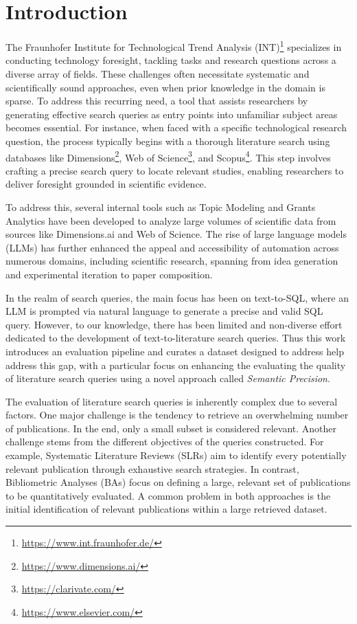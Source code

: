 \chapter{Introduction}\label{ch:intro}

The Fraunhofer Institute for Technological Trend Analysis (INT)\footnote{\url{https://www.int.fraunhofer.de/}} specializes in conducting technology foresight, tackling tasks and research questions across a diverse array of fields. These challenges often necessitate systematic and scientifically sound approaches, even when prior knowledge in the domain is sparse. To address this recurring need, a tool that assists researchers by generating effective search queries as entry points into unfamiliar subject areas becomes essential. For instance, when faced with a specific technological research question, the process typically begins with a thorough literature search using databases like Dimensions\footnote{\url{https://www.dimensions.ai/}}, Web of Science\footnote{\url{https://clarivate.com/}}, and Scopus\footnote{\url{https://www.elsevier.com/}}. This step involves crafting a precise search query to locate relevant studies, enabling researchers to deliver foresight grounded in scientific evidence.

To address this, several internal tools such as Topic Modeling and Grants Analytics have been developed to analyze large volumes of scientific data from sources like Dimensions.ai and Web of Science. The rise of large language models (LLMs) has further enhanced the appeal and accessibility of automation across numerous domains, including scientific research, spanning from idea generation and experimental iteration to paper composition\autocite{lu2024aiscientistfullyautomated}.

In the realm of search queries, the main focus has been on text-to-SQL\autocite{dong2023c3}, where an LLM is prompted via natural language to generate a precise and valid SQL query. However, to our knowledge, there has been limited and non-diverse effort dedicated to the development of text-to-literature search queries. Thus this work introduces an evaluation pipeline and curates a dataset designed to address help address this gap, with a particular focus on enhancing the evaluating the quality of literature search queries using a novel approach called \textit{Semantic Precision}.

The evaluation of literature search queries is inherently complex due to several factors. One major challenge is the tendency to retrieve an overwhelming number of publications. In the end, only a small subset is considered relevant. Another challenge stems from the different objectives of the queries constructed. For example, Systematic Literature Reviews (SLRs) aim to identify every potentially relevant publication through exhaustive search strategies. In contrast, Bibliometric Analyses (BAs) focus on defining a large, relevant set of publications to be quantitatively evaluated. A common problem in both approaches is the initial identification of relevant publications within a large retrieved dataset.

